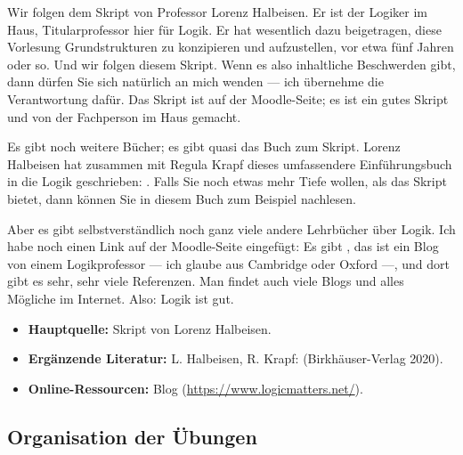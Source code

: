 \begin{spoken-clean}[00:05:10 - 00:07:30]
Wir folgen dem Skript von Professor Lorenz Halbeisen. Er ist der Logiker im Haus, Titularprofessor hier für Logik. Er hat wesentlich dazu beigetragen, diese Vorlesung Grundstrukturen zu konzipieren und aufzustellen, vor etwa fünf Jahren oder so. Und wir folgen diesem Skript. Wenn es also inhaltliche Beschwerden gibt, dann dürfen Sie sich natürlich an mich wenden --- ich übernehme die Verantwortung dafür. Das Skript ist auf der Moodle-Seite; es ist ein gutes Skript und von der Fachperson im Haus gemacht.

Es gibt noch weitere Bücher; es gibt quasi das Buch zum Skript. Lorenz Halbeisen hat zusammen mit Regula Krapf dieses umfassendere Einführungsbuch in die Logik geschrieben: . Falls Sie noch etwas mehr Tiefe wollen, als das Skript bietet, dann können Sie in diesem Buch zum Beispiel nachlesen. 

Aber es gibt selbstverständlich noch ganz viele andere Lehrbücher über Logik. Ich habe noch einen Link auf der Moodle-Seite eingefügt: Es gibt , das ist ein Blog von einem Logikprofessor --- ich glaube aus Cambridge oder Oxford ---, und dort gibt es sehr, sehr viele Referenzen. Man findet auch viele Blogs und alles Mögliche im Internet. Also: Logik ist gut.
\end{spoken-clean}

\begin{math-stroke}[Literatur]
\begin{itemize}
    \item \textbf{Hauptquelle:} Skript von Lorenz Halbeisen.
    \item \textbf{Ergänzende Literatur:} L. Halbeisen, R. Krapf:  (Birkhäuser-Verlag 2020).
    \item \textbf{Online-Ressourcen:} Blog  (\url{https://www.logicmatters.net/}).
\end{itemize}
\end{math-stroke}

\subsection{Organisation der Übungen}

